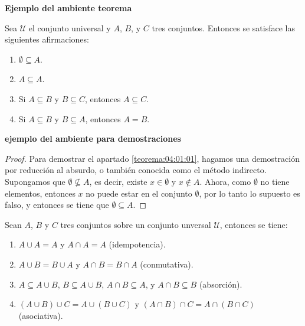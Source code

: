 \textbf{Ejemplo del ambiente teorema}

\begin{teo}[][teo:04:01] Sea $\mathcal{U}$ el conjunto universal y $A$, $B$, y $C$ tres conjuntos. Entonces se satisface las siguientes afirmaciones:
\begin{enumerate}[label=\itembolasgrises{\arabic{*}}]
 \item\label{teorema:04:01:01} $\emptyset\subseteq A$.
 \item\label{teorema:04:01:02} $A\subseteq A$.
 \item\label{teorema:04:01:03} Si $A\subseteq B$ y $B\subseteq C$, entonces $A\subseteq C$.
 \item\label{teorema:04:01:04} Si $A\subseteq B$ y $B\subseteq A$, entonces $A=B$.
\end{enumerate}
\end{teo}

\textbf{ejemplo del ambiente para demostraciones}
\begin{proof} Para demostrar el apartado \ref{teorema:04:01:01}, hagamos una demostración por reducción al absurdo, o 
también conocida como el método indirecto. Supongamos que $\emptyset\nsubseteq A$, es decir, existe $x\in\emptyset$ y 
$x\notin A$. Ahora, como $\emptyset$ no tiene elementos, entonces $x$ no puede estar en el conjunto $\emptyset$, por lo 
tanto lo supuesto es falso, y entonces se tiene que $\emptyset\subseteq A$.
\end{proof}


\begin{propo}[][pro:04:01] Sean $A$, $B$ y $C$ tres conjuntos sobre un conjunto unversal $\mathcal{U}$, entonces se tiene:
\begin{enumerate}[label=\itembolasgrises{\arabic{*}}]
 \item\label{proposicion:04:01:01} $A\cup A=A$ y $A\cap A=A$ (idempotencia).
 \item\label{proposicion:04:01:02} $A\cup B=B\cup A$ y $A\cap B=B\cap A$ (conmutativa).
 \item\label{proposicion:04:01:03} $A\subseteq A\cup B$, $B\subseteq A\cup B$, $A\cap B\subseteq A$, y $A\cap B\subseteq B$ (absorción).
 \item\label{proposicion:04:01:04} $(A\cup B)\cup C=A\cup(B\cup C)$ y $(A\cap B)\cap C=A\cap(B\cap C)$ (asociativa).
\end{enumerate}
\end{propo}


{}
\pagestyle{probprop}
\pagecolor{paginaprob}

